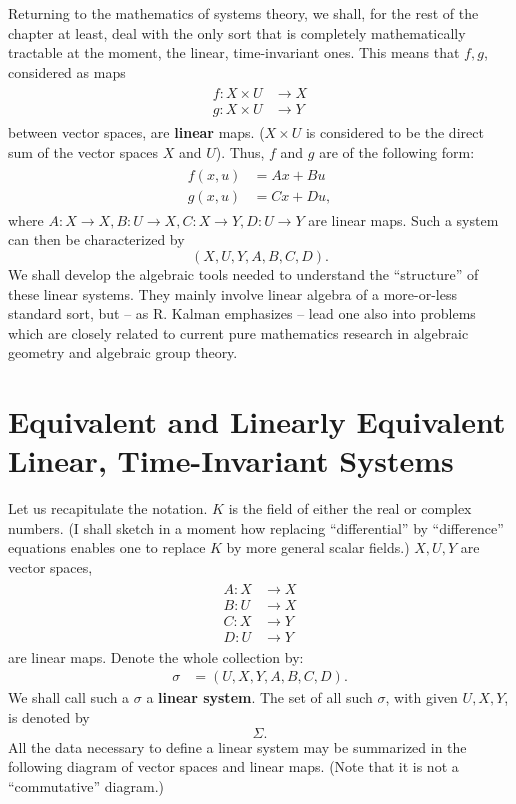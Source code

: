 \documentclass[12pt]{book}
\theoremstyle{plain}
\theoremstyle{definition}
\begin{document}
Returning to the mathematics of systems theory, we shall, for the rest of the chapter at least, deal with the only sort that is completely mathematically tractable at the moment, the linear, time-invariant ones.
This means that $f, g$, considered as maps
\begin{align*}
\begin{split}
    f: X \times U &\to X \\
    g: X \times U &\to Y
\end{split}
\end{align*}
between vector spaces, are \textbf{linear} maps.
($X \times U$ is considered to be the direct sum of the vector spaces $X$ and $U$). Thus, $f$ and $g$ are of the following form:
\begin{align}
\begin{split}
    f(x, u) &= Ax + Bu \\
    g(x, u) &= Cx + Du,
\end{split}
\end{align}
where $A: X \to X, B: U \to X, C: X \to Y, D: U \to Y$ are linear maps.
Such a system can then be characterized by
$$(X, U, Y, A, B, C, D).$$
We shall develop the algebraic tools needed to understand the ``structure'' of these linear systems.
They mainly involve linear algebra of a more-or-less standard sort, but -- as R. Kalman emphasizes -- lead one also into problems which are closely related to current pure mathematics research in algebraic geometry and algebraic group theory.

\section{Equivalent and Linearly Equivalent Linear, Time-Invariant Systems}

Let us recapitulate the notation.
$K$ is the field of either the real or complex numbers.
(I shall sketch in a moment how replacing ``differential'' by ``difference'' equations enables one to replace $K$ by more general scalar fields.)
$X, U, Y$ are vector spaces,
\begin{align*}
\begin{split}
    A: X &\to X \\
    B: U &\to X \\
    C: X &\to Y \\
    D: U &\to Y
\end{split}
\end{align*}
are linear maps.
Denote the whole collection by:
\begin{align} \label{eq:sigma1}
    \sigma &= (U, X, Y, A, B, C, D).
\end{align}
We shall call such a $\sigma$ a \textbf{linear system}. The set of all such $\sigma$, with given $U, X, Y$, is denoted by
$$\Sigma.$$
All the data necessary to define a linear system may be summarized in the following diagram of vector spaces and linear maps.
(Note that it is not a ``commutative'' diagram.)
\end{document}
